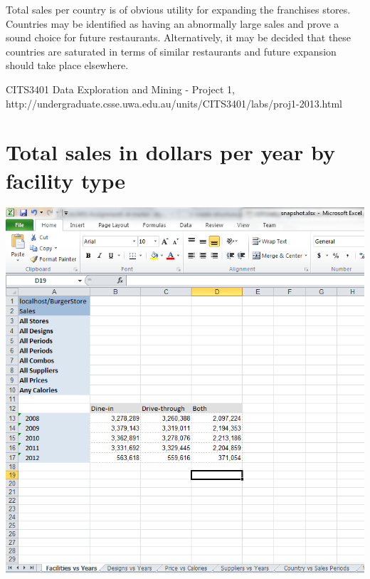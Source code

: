 \documentclass[12pt, a4paper]{article}
\begin{document}
Total sales per country is of obvious utility for expanding the franchises stores. Countries may be identified as having an abnormally large sales and prove a sound choice for future restaurants. Alternatively, it may be decided that these countries are saturated in terms of similar restaurants and future expansion should take place elsewhere.

\begin{thebibliography}{9}

	CITS3401 Data Exploration and Mining - Project 1,
	http://undergraduate.csse.uwa.edu.au/units/CITS3401/labs/proj1-2013.html
		
\end{thebibliography}



\appendix
\section{Total sales in dollars per year by facility type} 
\includegraphics{diagrams/FacilitiesVsYears}
\end{document}
